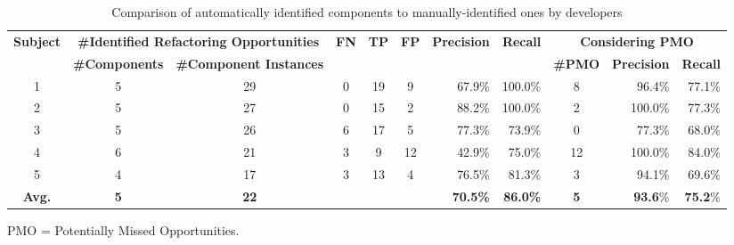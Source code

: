 \begin{table}
	\centering
	\caption{Comparison of automatically identified components to manually-identified ones by developers}
	\label{table:comparison-results}
	\begin{threeparttable}
		\begin{tabular}{c c c c c c r r | c r r}
		\toprule
		\multirow{2}{*}{\textbf{Subject}}
						& \multicolumn{2}{c}{\textbf{\#Identified Refactoring Opportunities}}
														& \multirow{2}{*}{\textbf{FN}}
																& \multirow{2}{*}{\textbf{TP}} 
																		& \multirow{2}{*}{\textbf{FP}}
																				& \multirow{2}{*}{\textbf{Precision}}
										 													& \multirow{2}{*}{\textbf{Recall}} 
										 																& \multicolumn{3}{c}{\textbf{Considering PMO}\tnote{\textdagger}}
														 												\\ \hhline{~--~~~~~---}
						& \textbf{\scriptsize \#Components}
										& \textbf{\scriptsize \#Component Instances}
														& 		&		& 		&  			&			&  \textbf{{\#}PMO}		& \textbf{Precision} 
																															& \textbf{Recall} 	\\ \toprule
		1 				& 5				& 29			& 0 	& 19	& 9 	& 67.9\% 	&  100.0\% 	& 8	& 96.4\%	& 77.1\%            \\
		2 				& 5				& 27			& 0 	& 15	& 2  	& 88.2\%  	&  100.0\%  & 2	& 100.0\%	& 77.3\%			\\
		3 				& 5				& 26			& 6 	& 17	& 5 	& 77.3\%  	&  73.9\%   & 0	& 77.3\%	& 68.0\%			\\
		4 				& 6				& 21			& 3 	& 9		& 12 	& 42.9\%   	&  75.0\%   & 12	& 100.0\%	& 84.0\%			\\
		5 				& 4				& 17			& 3 	& 13	& 4 	& 76.5\%   	&  81.3\%   & 3	& 94.1\%	& 69.6\% 			\\ \midrule
		\textbf{Avg.}	& \textbf{5}	& \textbf{22}	&		& 		&   	& \textbf{70.5\%}	
																							& \textbf{86.0\%}  	
																										& \textbf{5} 
																												& \textbf{93.6}\%  		
																															& \textbf{75.2}\% \\ \bottomrule
		\end{tabular}
		\begin{tablenotes}
			\item[\textdagger] PMO = Potentially Missed Opportunities.
		\end{tablenotes}
	\end{threeparttable}
\end{table}

